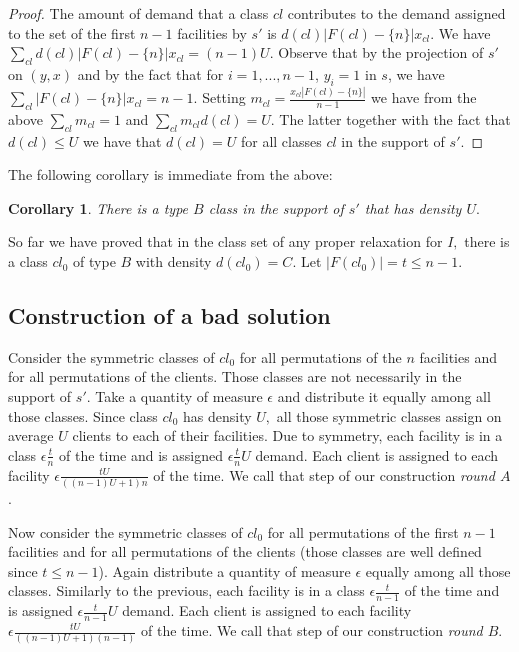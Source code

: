 \documentclass[11pt]{article}\usepackage{amsmath}
\newtheorem{corollary}{Corollary}[section]
\begin{document}
\begin{proof}
The amount of demand that a class $cl$ contributes to the demand assigned to the set
of the first $n-1$ facilities by $s'$ is $d(cl)|F(cl)-\{n\}|x_{cl}.$
 We have $\sum_{cl}d(cl)|F(cl)-\{n\}|x_{cl}=(n-1)U$.
 Observe
that by the projection of $s'$ on $(y,x)$ and by the fact that for $i=1,...,n-1$,
 $y_i=1$ in $s$, we have $\sum_{cl}|F(cl)-\{n\}|x_{cl}=n-1$. 
Setting $m_{cl}=\frac{x_{cl}|F(cl)-\{n\}|}{n-1}$ we have from
the above $\sum_{cl}m_{cl}=1$ and $\sum_{cl}m_{cl}d(cl)=U$. 
The latter together with the fact that $d(cl)\leq U$ we have that $d(cl)=U$ for all classes
$cl$ in the support of $s'$.
\end{proof}

The following corollary is immediate from the above:

\begin{corollary}
There is a type $B$ class in the support of $s'$ that has density $U.$
\end{corollary}

So far we have proved that 
in the class set of any proper relaxation for $I,$ there is 
a class $cl_0$ of type $B$ with density $d(cl_0)=C$.
 Let $|F(cl_0)| = t \leq n-1.$ 


\subsection{Construction of a bad solution}

Consider the symmetric classes of $cl_0$ for all permutations of the $n$ facilities
and for all permutations of the clients. Those classes are not necessarily in the support of $s'$. Take a quantity of measure $\epsilon$ and distribute it equally among all 
those classes. Since class $cl_0$ has density $U,$ all those symmetric classes
assign on average $U$ clients to each of their facilities. 
Due to symmetry, each facility is in a class $\epsilon \frac{t}{n}$ of the time and is assigned $\epsilon \frac{t}{n}U$ demand. Each client is assigned to
each facility $\epsilon\frac{tU}{((n-1)U+1)n}$ of the time. We call that step of our construction \emph{round $A$}.

Now consider the symmetric classes of $cl_0$ for all permutations of the first $n-1$ facilities
and for all permutations of the clients (those classes are well defined since $t\leq n-1$).
Again distribute a quantity of measure $\epsilon$ equally among all 
those classes. Similarly to the previous, each facility is in a class $\epsilon \frac{t}{n-1}$ of the time and is assigned $\epsilon \frac{t}{n-1}U$ demand. Each client is assigned to
each facility $\epsilon\frac{tU}{((n-1)U+1)(n-1)}$ of the time. 
We call that step of our construction \emph{round $B$}.
\end{document}
